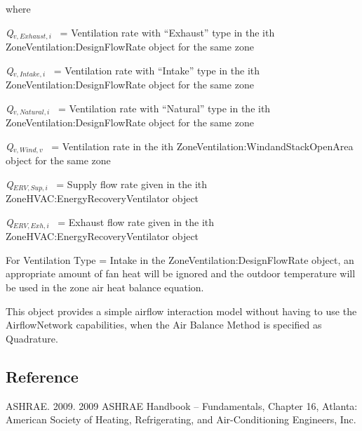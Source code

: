 where

\emph{Q\(_{v,Exhaust,i}\)}~ = Ventilation rate with ``Exhaust'' type in the ith ZoneVentilation:DesignFlowRate object for the same zone

\emph{Q\(_{v,Intake,i}\)}~ = Ventilation rate with ``Intake'' type in the ith ZoneVentilation:DesignFlowRate object for the same zone

\emph{Q\(_{v,Natural,i}\)}~ = Ventilation rate with ``Natural'' type in the ith ZoneVentilation:DesignFlowRate object for the same zone

\emph{Q\(_{v,Wind,v}\)}~ = Ventilation rate in the ith ZoneVentilation:WindandStackOpenArea object for the same zone

\emph{Q\(_{ERV,Sup,i}\)}~ = Supply flow rate given in the ith ZoneHVAC:EnergyRecoveryVentilator object

\emph{Q\(_{ERV,Exh,i}\)}~ = Exhaust flow rate given in the ith ZoneHVAC:EnergyRecoveryVentilator object

For Ventilation Type = Intake in the ZoneVentilation:DesignFlowRate object, an appropriate amount of fan heat will be ignored and the outdoor temperature will be used in the zone air heat balance equation.

This object provides a simple airflow interaction model without having to use the AirflowNetwork capabilities, when the Air Balance Method is specified as Quadrature.

\subsection{Reference}\label{reference}

ASHRAE. 2009. 2009 ASHRAE Handbook -- Fundamentals, Chapter 16, Atlanta: American Society of Heating, Refrigerating, and Air-Conditioning Engineers, Inc.
